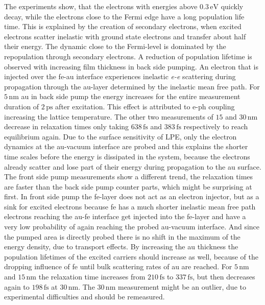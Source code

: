 \documentclass[a4paper,12pt,twoside]{article}
\begin{document}
The experiments show, that the electrons with energies above $0.3\,\mathrm{eV}$ quickly decay, while the electrons close to the Fermi edge have a long population life time. This is explained by the creation of secondary electrons, when excited electrons scatter inelastic with ground state electrons and transfer about half their energy. The dynamic close to the Fermi-level is dominated by the repopulation through secondary electrons. A reduction of population lifetime is observed with increasing film thickness in back side pumping. An electron that is injected over the \gls{fe}-\gls{au} interface experiences inelastic \textit{e-e} scattering during propagation through the \gls{au}-layer determined by the inelastic mean free path. For $5\,\mathrm{nm}$ \gls{au} in back side pump the energy increases for the entire measurement duration of $2\,\mathrm{ps}$ after excitation. This effect is attributed to e-ph coupling increasing the lattice temperature. The other two measurements of $15$ and $30\,\mathrm{nm}$ decrease in relaxation times only taking $638\,\mathrm{fs}$ and $383\,\mathrm{fs}$ respectively to reach equilibrium again. Due to the surface sensitivity of \gls{LPE}, only the electron dynamics at the \gls{au}-vacuum interface are probed and this explains the shorter time scales before the energy is dissipated in the system, because the electrons already scatter and lose part of their energy during propagation to the \gls{au} surface.
The front side pump measurements show a different trend, the relaxation times are faster than the back side pump counter parts, which might be surprising at first. In front side pump the \gls{fe}-layer does not act as an electron injector, but as a sink for excited electrons because \gls{fe} has a much shorter inelastic mean free path electrons reaching the \gls{au}-\gls{fe} interface get injected into the \gls{fe}-layer and have a very low probability of again reaching the probed \gls{au}-vacuum interface. And since the pumped area is directly probed there is no shift in the maximum of the energy density, due to transport effects. By increasing the \gls{au} thickness the population lifetimes of the excited carriers should increase as well, because of the dropping influence of \gls{fe} until bulk scattering rates of \gls{au} are reached. For $5\,\mathrm{nm}$ and $15\,\mathrm{nm}$ the relaxation time increases from $210\,\mathrm{fs}$ to $337\,\mathrm{fs}$, but then decreases again to $198\,\mathrm{fs}$ at $30\,\mathrm{nm}$. The $30\,\mathrm{nm}$ measurement might be an outlier, due to experimental difficulties and should be remeasured.
\end{document}
